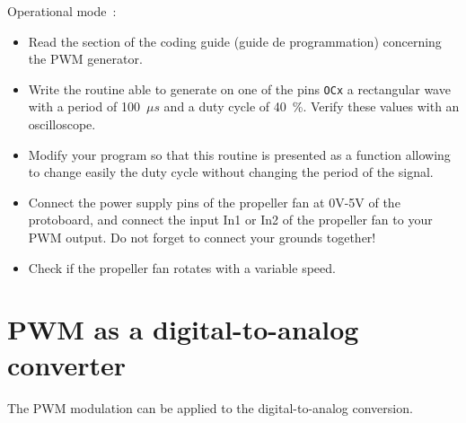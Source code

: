 \documentclass[11pt,a4paper]{article}
\theoremstyle{definition}%
\begin{document}
Operational mode~:
\begin{itemize}
	\item Read the section of the coding guide (guide de programmation) concerning the PWM generator.
	\item Write the routine able to generate on one of the pins \texttt{OCx} a rectangular wave with a period of 100~$\mu s$ and a duty cycle of 40~\%.
	Verify these values with an oscilloscope.
	\item Modify your program so that this routine is presented as a function allowing to change easily the duty cycle without changing the period of the signal.
	\item Connect the power supply pins of the propeller fan at 0V-5V of the protoboard, and connect the input In1 or In2 of the propeller fan to your PWM output.
	Do not forget to connect your grounds together!
	\item Check if the propeller fan rotates with a variable speed.
\end{itemize}







\section{PWM as a digital-to-analog converter}
The PWM modulation can be applied to the digital-to-analog conversion.
\end{document}
